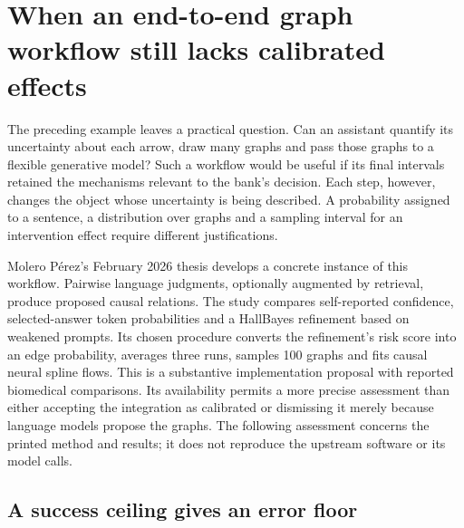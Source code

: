 \section{When an end-to-end graph workflow still lacks calibrated effects}
\label{rel64:graph-confidence}

The preceding example leaves a practical question. Can an assistant quantify
its uncertainty about each arrow, draw many graphs and pass those graphs to a
flexible generative model? Such a workflow would be useful if its final
intervals retained the mechanisms relevant to the bank's decision. Each step,
however, changes the object whose uncertainty is being described. A probability
assigned to a sentence, a distribution over graphs and a sampling interval for
an intervention effect require different justifications.

Molero P{\'e}rez's February 2026 thesis develops a concrete instance of this
workflow. Pairwise language judgments, optionally augmented by retrieval,
produce proposed causal relations. The study compares self-reported
confidence, selected-answer token probabilities and a HallBayes refinement
based on weakened prompts. Its chosen procedure converts the refinement's
risk score into an edge probability, averages three runs, samples 100 graphs
and fits causal neural spline flows. This is a substantive implementation
proposal with reported biomedical comparisons. Its availability permits a
more precise assessment than either accepting the integration as calibrated
or dismissing it merely because language models propose the graphs. The
following assessment concerns the printed method and results; it does not
reproduce the upstream software or its model calls.\citep{rel64molero}

\subsection{A success ceiling gives an error floor}


